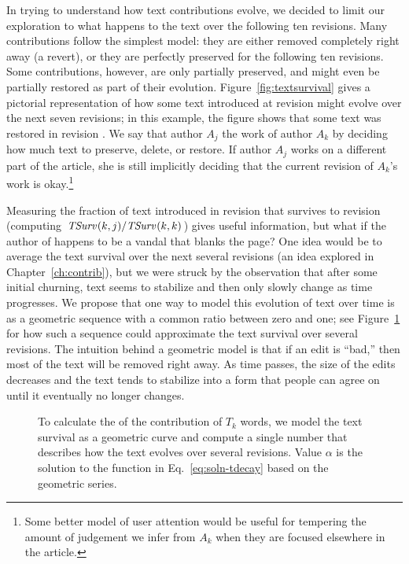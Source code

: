 In trying to understand how text contributions evolve, we decided
to limit our exploration to what happens to the text over the
following ten revisions.
Many contributions follow the simplest model: they are either
removed completely right away (a revert), or they are perfectly
preserved for the following ten revisions.
Some contributions, however, are only partially preserved, and
might even be partially restored as part of their evolution.
Figure~\ref{fig:textsurvival} gives a pictorial representation
of how some text introduced at revision  might
evolve over the next seven revisions; in this example, the
figure shows that some text was restored in revision .
We say that author $A_j$  the work of author
$A_k$ by deciding how much text to preserve, delete, or restore.
If author $A_j$ works on a different part of the article, she
is still implicitly deciding that the current revision of
$A_k$'s work is okay.\footnote{Some better model of
user attention would be useful for tempering the amount
of judgement we infer from
$A_k$ when they are focused elsewhere in the article.}

Measuring the fraction of text introduced in
revision  that survives to revision 
(\ie computing $\mathit{TSurv}_{}(k,j) / \mathit{TSurv}_{}(k,k)$)
gives useful information, but what if the author of  happens to be
a vandal that blanks the page?
One idea would be to average the text survival over the next
several revisions (an idea explored in Chapter~\ref{ch:contrib}),
but we were struck by the observation that after some initial
churning, text seems to stabilize and then only slowly change
as time progresses.
We propose that one way to model this evolution of text over time
is as a geometric sequence with a common ratio between zero and one;
see Figure~\ref{fig:textlongevity} for how such a sequence could
approximate the text survival over several revisions.
The intuition behind a geometric model is that if an edit is
``bad,'' then most of the text will be removed right away.
As time passes, the size of the edits decreases and
the text tends to stabilize into a form
that people can agree on until it eventually no longer changes.


\begin{figure}[tbph]
\centering
{}
\caption[Text longevity is modeled as a geometric curve]
    {To calculate the  of the contribution
    of $T_k$ words, we model the text survival as a geometric curve
    and compute a single number that describes how the text evolves
    over several revisions.
    Value $\alpha$ is the solution to the function in
    Eq.~\ref{eq:soln-tdecay} based on the geometric series.
    }
\label{fig:textlongevity}
\end{figure}

